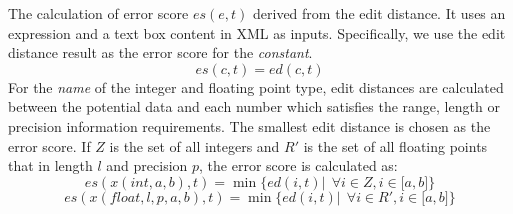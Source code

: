 The calculation of error score $es(e, t)$ derived from the edit 
distance. It uses an expression and a text box content in XML as inputs. 
Specifically, we use the edit distance result as 
the error score for the {\em constant}. 
\begin{equation}
es(c, t) = ed(c, t)
\end{equation}
For the {\em name} of the integer and floating point type, 
edit distances are calculated between the potential data and each number 
which satisfies the range, length or precision information requirements. 
The smallest edit distance is chosen as the error score. 
If $Z$ is the set of all integers and $R'$ is the set of 
all floating points that in length $l$ and precision $p$, 
the error score is calculated as: 
\begin{equation}
es(x(int, a, b), t)=\min\{ed(i, t)| ~~\forall i \in Z, i \in \lbrack a, b \rbrack\}
\end{equation}
\begin{equation}
es(x(float, l, p, a, b), t)=\min\{ed(i, t)| ~~\forall i \in R', i \in \lbrack a, b \rbrack\}
\end{equation}

